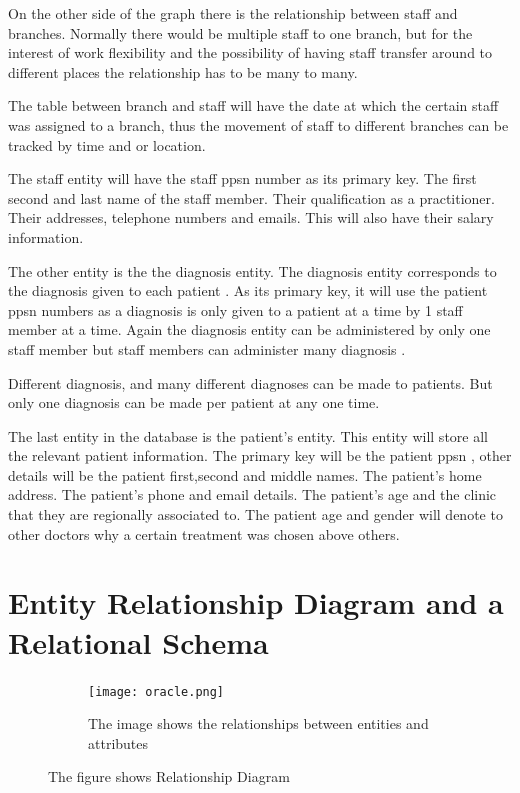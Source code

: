 \documentclass{article}
\begin{document}
On the other side of the graph there is the relationship between staff and branches. Normally there would be multiple staff to one branch, but for the interest of work flexibility and the possibility of having staff transfer around to different places the relationship has to be many to many.


The table between branch and staff will have the date at which the certain staff was assigned to a branch, thus the movement of staff to different branches can be tracked by time and or location.


The staff entity will have the staff ppsn number as its primary key. The first second and last name of the staff member. Their qualification as a practitioner. Their addresses, telephone numbers and emails. This will also have their salary information.


The other entity is the the diagnosis entity. The diagnosis entity corresponds to the diagnosis given to each patient .
As its primary key, it will use the patient ppsn numbers as a diagnosis is only given to a patient at a time by 1 staff member at a time. Again the diagnosis entity can be administered by only one staff member but staff members can administer many diagnosis .

Different diagnosis, and many different diagnoses can be made to patients. But only one diagnosis can be made per patient at any one time.


The last entity in the database is the patient's entity. This entity will store all the relevant patient information. The primary key will be the patient ppsn , other details will be the patient first,second and middle names. The patient's home address. The patient's phone and email details. The patient's age and the clinic that they are regionally associated to. The patient age and gender will denote to other doctors why a certain treatment was chosen above others.


\pagebreak




\section{Entity Relationship Diagram and a Relational Schema}


\begin{figure}[H]

	\begin{subfigure}{0.5\textwidth}
		\texttt{[image: oracle.png]} 
		\caption{The image shows the relationships between entities and attributes}
		\label{fig:subim2}
	\end{subfigure}
	\caption{The figure shows Relationship Diagram}
	\label{fig:image2}
\end{figure}
\end{document}
